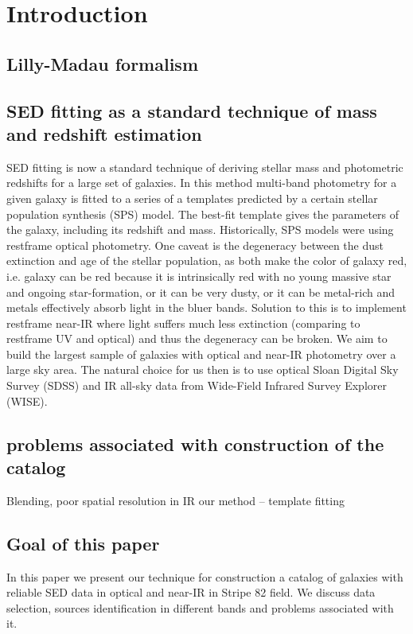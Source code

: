 \documentclass[apj,iop]{emulateapj}
\begin{document}
\section{Introduction}

\subsection{Lilly-Madau formalism}

\subsection{SED fitting as a standard technique of mass and redshift estimation}
SED fitting is now a standard technique of deriving stellar mass and photometric redshifts for a large set of galaxies. In this method multi-band photometry for a given galaxy is fitted to a series of a templates predicted by a certain stellar population synthesis (SPS) model. The best-fit template gives the parameters of the galaxy, including its redshift and mass.
Historically, SPS models were using restframe optical photometry. One caveat is the degeneracy between the dust extinction and age of the stellar population, as both make the color of galaxy red, i.e. galaxy can be red because it is intrinsically red with no young massive star and ongoing star-formation, or it can be very dusty, or it can be metal-rich and metals effectively absorb light in the bluer bands. Solution to this is to implement restframe near-IR where light suffers much less extinction (comparing to restframe UV and optical) and thus the degeneracy can be broken.
We aim to build the largest sample of galaxies with optical and near-IR photometry over a large sky area. The natural choice for us then is to use optical Sloan Digital Sky Survey (SDSS) and IR all-sky data from Wide-Field Infrared Survey Explorer (WISE).

\subsection{problems associated with construction of the catalog}
Blending, poor spatial resolution in IR
our method – template fitting

\subsection{Goal of this paper}

In this paper we present our technique for construction a catalog of galaxies with reliable SED data in optical and near-IR in Stripe 82 field. We discuss data selection, sources identification in different bands and problems associated with it.
\end{document}
